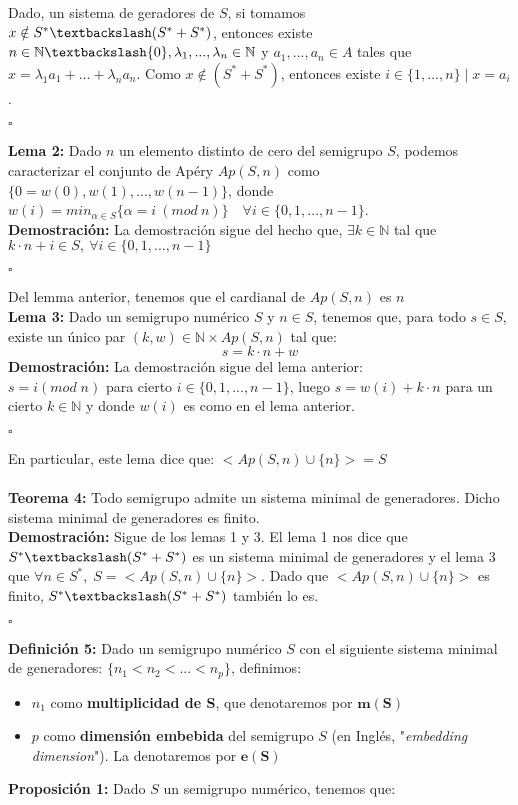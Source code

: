\documentclass[10pt,spanish]{book}
\newcommand{\qed}{\begin{flushright} $\square$ \end{flushright}}
\begin{document}
Dado, un sistema de geradores de $S$, si tomamos $x\notin S^{*}\textbackslash (S^{*}+S^{*})$, entonces existe $n\in \mathbb{N}\textbackslash\{0\}, \lambda_{1},...,\lambda_{n}\in\mathbb{N}$ y $a_{1},...,a_{n}\in A$ tales que $x=\lambda_{1}a_{1}+...+\lambda_{n}a_{n}$. Como $x\notin (S^{*}+S^{*})$, entonces existe $i\in\{1,...,n\}\; |\; x=a_{i}$.
\qed
\textbf{Lema 2:} Dado $n$ un elemento distinto de cero del semigrupo $S$, podemos caracterizar el conjunto de Apéry $Ap(S,n)$ como $\{0=w(0), w(1),...,w(n-1)\}$, donde $w(i) = min_{\alpha\in S}\{\alpha = i\:(mod\: n)\}\quad \forall i\in\{0,1,...,n-1\}$. \\
\textbf{Demostración:} La demostración sigue del hecho que,  $\exists k\in \mathbb{N}$ tal que $k\cdot n + i \in S,\: \forall i\in \{0,1,...,n-1\}$ 
\qed
Del lemma anterior, tenemos que el cardianal de $Ap(S, n)$ es $n$\\
\textbf{Lema 3:} Dado un semigrupo numérico $S$ y $n\in S$, tenemos que, para todo $s\in S$, existe un único par $(k,w)\in \mathbb{N}\times Ap(S,n)$ tal que:
$$s=k\cdot n + w$$ 
\textbf{Demostración:} La demostración sigue del lema anterior:\\ $s = i (mod\; n)$ para cierto $i\in \{0,1,...,n-1\}$, luego $s=w(i)+k\cdot n$ para un cierto $k\in \mathbb{N}$ y donde $w(i)$ es como en el lema anterior.
\qed
En particular, este lema dice que: $<Ap(S,n)\cup\{n\}>=S$\\
\\ \textbf{Teorema 4: } Todo semigrupo admite un sistema minimal de generadores. Dicho sistema minimal de generadores es finito. \\
\textbf{Demostración: } Sigue de los lemas 1 y 3. El lema 1 nos dice que $S^{*}\textbackslash (S^{*}+S^{*})$ es un sistema minimal de generadores y el lema 3 que  $\forall n\in S^{*},\; S=<Ap(S,n)\cup\{n\}>$. Dado que  $<Ap(S,n)\cup\{n\}>$ es finito, $S^{*}\textbackslash (S^{*}+S^{*})$ también lo es.
\qed
\textbf{Definición 5:} Dado un semigrupo numérico $S$ con el siguiente sistema minimal de generadores: $\{n_{1}<n_{2}<...<n_{p}\}$, definimos:
\begin{itemize}
	\item $n_{1}$ como \textbf{multiplicidad de S}, que denotaremos por $\mathbf{m(S)}$
	\item $p$ como \textbf{dimensión embebida} del semigrupo $S$ (en Inglés, "\textit{embedding dimension}"). La denotaremos por $\mathbf{e(S)}$
\end{itemize}
\textbf{Proposición 1:} Dado $S$ un semigrupo numérico, tenemos que:
\end{document}
